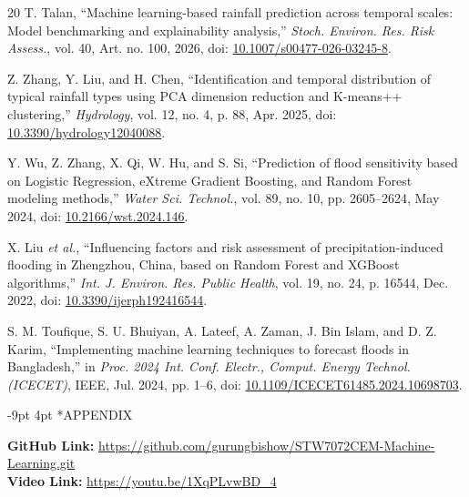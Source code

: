 \documentclass[10pt,twocolumn,a4paper]{article}
\makeatletter
\renewcommand{\section}{\@startsection{section}{1}{\z@}%
  {-9pt \@plus -2pt \@minus -1pt}%
  {4pt \@plus 1pt}%
  {\centering\normalfont\normalsize\bfseries\scshape}}
\makeatother
\begin{document}
\begin{thebibliography}{20}
 T. Talan, ``Machine learning-based rainfall prediction across temporal scales: Model benchmarking and explainability analysis,'' \textit{Stoch. Environ. Res. Risk Assess.}, vol. 40, Art. no. 100, 2026, doi: \href{https://doi.org/10.1007/s00477-026-03245-8}{10.1007/s00477-026-03245-8}.

 Z. Zhang, Y. Liu, and H. Chen, ``Identification and temporal distribution of typical rainfall types using PCA dimension reduction and K-means++ clustering,'' \textit{Hydrology}, vol. 12, no. 4, p. 88, Apr. 2025, doi: \href{https://doi.org/10.3390/hydrology12040088}{10.3390/hydrology12040088}.

 Y. Wu, Z. Zhang, X. Qi, W. Hu, and S. Si, ``Prediction of flood sensitivity based on Logistic Regression, eXtreme Gradient Boosting, and Random Forest modeling methods,'' \textit{Water Sci. Technol.}, vol. 89, no. 10, pp. 2605--2624, May 2024, doi: \href{https://doi.org/10.2166/wst.2024.146}{10.2166/wst.2024.146}.

 X. Liu \textit{et al.}, ``Influencing factors and risk assessment of precipitation-induced flooding in Zhengzhou, China, based on Random Forest and XGBoost algorithms,'' \textit{Int. J. Environ. Res. Public Health}, vol. 19, no. 24, p. 16544, Dec. 2022, doi: \href{https://doi.org/10.3390/ijerph192416544}{10.3390/ijerph192416544}.

 S. M. Toufique, S. U. Bhuiyan, A. Lateef, A. Zaman, J. Bin Islam, and D. Z. Karim, ``Implementing machine learning techniques to forecast floods in Bangladesh,'' in \textit{Proc. 2024 Int. Conf. Electr., Comput. Energy Technol. (ICECET)}, IEEE, Jul. 2024, pp. 1--6, doi: \href{https://doi.org/10.1109/ICECET61485.2024.10698703}{10.1109/ICECET61485.2024.10698703}.

\end{thebibliography}
\clearpage
\onecolumn
\section*{APPENDIX}

\noindent
\textbf{GitHub Link:} \url{https://github.com/gurungbishow/STW7072CEM-Machine-Learning.git}\\
\textbf{Video Link:} \url{https://youtu.be/1XqPLvwBD_4}
\vspace{0.8em}
\end{document}
